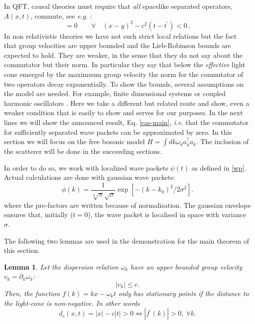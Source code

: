 \documentclass[notitlepage, prx, preprint, amsmath,superscriptaddress,amssymb]{revtex4-1}
\newtheorem{lemma}{Lemma}[section]
\begin{document}
In QFT, causal theories must require that \emph{all} spacelike separated operators, $A(x,t)$,  commute, see \emph{e.g.} \cite[Sect. 2.6.1]{tong2006}:
\begin{equation}
[ A (x, t), A (y,t^\prime)]= 0  \qquad \forall \quad  (x-y)^2 -c^2 (t-t^\prime) <0 \, .
\end{equation}
In non relativistic theories we have not such strict local relations but the fact that group velocities are upper bounded and the Lieb-Robinson bounds are expected to hold.  They are weaker, in the sense that they do not say about the commutator but their norm.  In particular they say that below the \emph{effective} light cone emerged by the maximuum group velocity the norm for the conmutator of two operators decay exponentially.   To show the bounds, several assumptions on the model are needed.  For example, finite dimensional systems or coupled harmonic oscillators \cite{}.  
Here we take a different but related route and show, even a weaker condition that is easily to show and serves for our purposes.  
In the next lines we will show the announced result, Eq. \eqref{cas-main}, \emph{i.e.} that  the commutator   for sufficiently separated wave packets can be approximated by zero.    
In this section we will focus on the free bosonic model $H = \int dk \omega_k a_k^\dagger a_k$. The inclusion of the scatterer will be done in the succeeding sections.

In order to do so, we  work with localized wave packets $\psi(t)$ as defined in \eqref{wp}.  Actual calculations are done with gaussian wave packets:
\begin{equation}
\phi(k) = \frac{1}{\sqrt[4]{\pi}\sqrt{\sigma}}
\exp\left[-(k-k_0)^2/2\sigma^2\right].
\label{eq:gaussian}
\end{equation}
where the pre-factors are written because of normalisation.   The gaussian envelope ensures that, initially ($t=0$), the wave packet is localised in space with variance $\sigma$.   


The following  two lemmas  are  used  in the demonstration for the main theorem of this section.

\begin{lemma}
\label{lemma:cones}
Let the dispersion relation $\omega_k$ have an upper bounded group velocity $v_k=\partial_k \omega_k$:
\begin{equation}
\vert  v_k \vert \leq c.
\end{equation}
Then, the function $f(k) = k x - \omega_k t$ only has stationary points if the distance to the light-cone is non-negative. In other words
\begin{equation}
d_c(x,t) =  | x | - c | t |  > 0 \Leftrightarrow | f^\prime (k) | > 0,\: \forall k.\label{eq:distance}
\end{equation}
\end{lemma}
\end{document}
